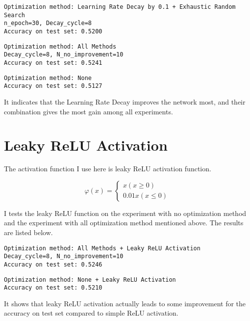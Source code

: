 \begin{verbatim}
Optimization method: Learning Rate Decay by 0.1 + Exhaustic Random Search
n_epoch=30, Decay_cycle=8
Accuracy on test set: 0.5200
\end{verbatim}

\begin{verbatim}
Optimization method: All Methods
Decay_cycle=8, N_no_improvement=10
Accuracy on test set: 0.5241
\end{verbatim}

\begin{verbatim}
Optimization method: None
Accuracy on test set: 0.5127
\end{verbatim}

It indicates that the Learning Rate Decay improves the network most, and their combination gives the most gain among all experiments.

\newpage
\section{Leaky ReLU Activation}

The activation function I use here is leaky ReLU activation function.

\[
	\varphi(x)=\left\{\begin{aligned}
		x (x\geq0)\\
		0.01x (x\leq0)
	\end{aligned}\right.
\]

I tests the leaky ReLU function on the experiment with no optimization method and the experiment with all optimization method mentioned above. The results are listed below. 

\begin{verbatim}
Optimization method: All Methods + Leaky ReLU Activation
Decay_cycle=8, N_no_improvement=10
Accuracy on test set: 0.5246
\end{verbatim}

\begin{verbatim}
Optimization method: None + Leaky ReLU Activation
Accuracy on test set: 0.5210
\end{verbatim}

It shows that leaky ReLU activation actually leads to some improvement for the accuracy on test set compared to simple ReLU activation.




